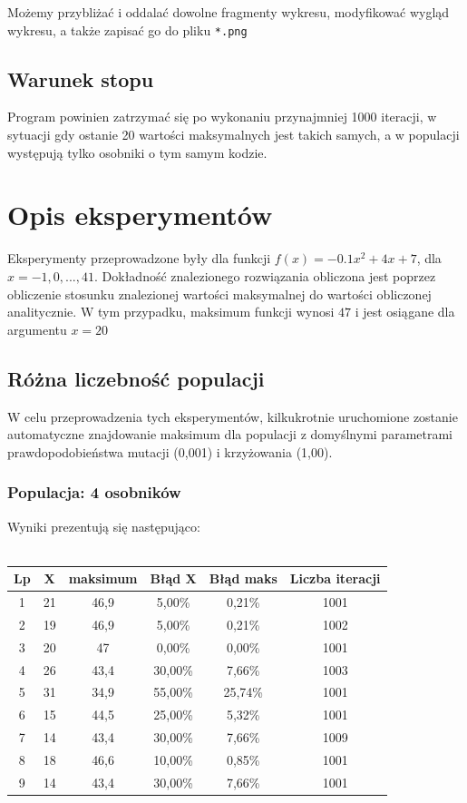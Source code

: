 \documentclass[a4paper,11pt]{article}
\begin{document}
			Możemy przybliżać i oddalać dowolne fragmenty wykresu, modyfikować wygląd wykresu, a także zapisać go do pliku \texttt{*.png}
			
		\subsection{Warunek stopu}
		Program powinien zatrzymać się po wykonaniu przynajmniej 1000 iteracji, w sytuacji gdy ostanie 20 wartości maksymalnych jest takich samych, a w populacji występują tylko osobniki o tym samym kodzie.
		
	\section{Opis eksperymentów}
	Eksperymenty przeprowadzone były dla funkcji $f(x) = -0.1x^2 + 4x + 7$, dla $x = -1, 0, ..., 41$. Dokładność znalezionego rozwiązania obliczona jest poprzez obliczenie stosunku znalezionej wartości maksymalnej do wartości obliczonej analitycznie. W tym przypadku, maksimum funkcji wynosi $47$ i jest osiągane dla argumentu $x = 20$
	
		\subsection{Różna liczebność populacji}
			W celu przeprowadzenia tych eksperymentów, kilkukrotnie uruchomione zostanie  automatyczne znajdowanie maksimum dla populacji z domyślnymi parametrami prawdopodobieństwa mutacji (0,001) i krzyżowania (1,00).
			\subsubsection{Populacja: 4 osobników}
				Wyniki prezentują się następująco:\\~\\
				\begin{tabular}{|c|c|c|c|c|c|}
					\hline 
					Lp & X & maksimum & Błąd X & Błąd maks & Liczba iteracji\\
					\hline
					1 & 21  & 46,9 & 5,00\%  & 0,21\% & 1001\\\hline
					2 & 19 & 46,9  & 5,00\% & 0,21\% & 1002\\\hline
					3 & 20  & 47   & 0,00\%  & 0,00\% & 1001\\\hline
					4 & 26 & 43,4  & 30,00\%  & 7,66\% & 1003\\\hline
					5 & 31 & 34,9  & 55,00\%  & 25,74\% & 1001\\\hline
					6 & 15 & 44,5  & 25,00\%  & 5,32\% & 1001\\\hline
					7 & 14 & 43,4  & 30,00\%  & 7,66\% & 1009\\\hline
					8 & 18 & 46,6  &  10,00\% & 0,85\% & 1001\\\hline
					9 & 14 & 43,4 & 30,00\% & 7,66\%& 1001\\\hline
				\end{tabular} 
\end{document}
